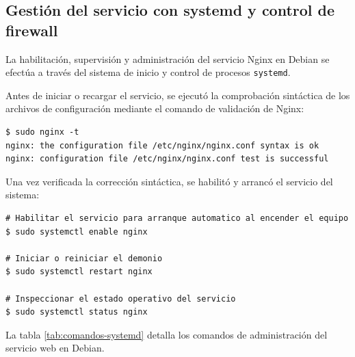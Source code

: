 \subsection{Gestión del servicio con systemd y control de firewall}

La habilitación, supervisión y administración del servicio Nginx en Debian se
efectúa a través del sistema de inicio y control de procesos \texttt{systemd}.

Antes de iniciar o recargar el servicio, se ejecutó la comprobación sintáctica de
los archivos de configuración mediante el comando de validación de Nginx:

\begin{lstlisting}[style=terminal]
$ sudo nginx -t
nginx: the configuration file /etc/nginx/nginx.conf syntax is ok
nginx: configuration file /etc/nginx/nginx.conf test is successful
\end{lstlisting}

Una vez verificada la corrección sintáctica, se habilitó y arrancó el servicio
del sistema:

\begin{lstlisting}[style=terminal]
# Habilitar el servicio para arranque automatico al encender el equipo
$ sudo systemctl enable nginx

# Iniciar o reiniciar el demonio
$ sudo systemctl restart nginx

# Inspeccionar el estado operativo del servicio
$ sudo systemctl status nginx
\end{lstlisting}

La tabla \ref{tab:comandos-systemd} detalla los comandos de administración del
servicio web en Debian.

\begin{table}[H]
\centering
\caption{Comandos de administración de Nginx con \texttt{systemd}}
\label{tab:comandos-systemd}
\end{table}

